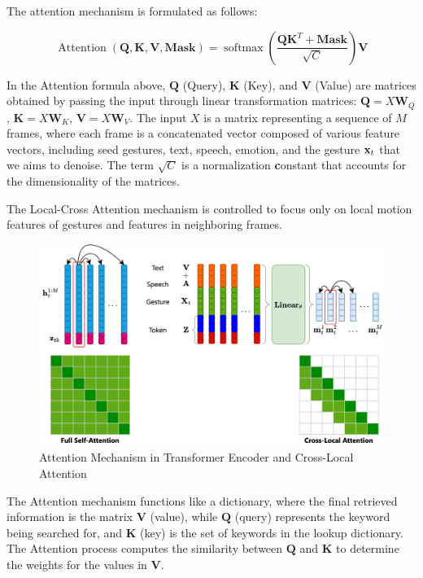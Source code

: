 The attention mechanism is formulated as follows:

\begin{equation} \label{eq:attention}
	\operatorname{Attention}(\mathbf{Q}, \mathbf{K}, \mathbf{V}, \mathbf{Mask})=\operatorname{softmax}\left(\frac{\mathbf{Q} \mathbf{K}^{T}+\mathbf{Mask}}{\sqrt{C}}\right) \mathbf{V}
\end{equation}

In the Attention formula above, $\mathbf{Q}$ (Query), $\mathbf{K}$ (Key), and $\mathbf{V}$ (Value) are matrices obtained by passing the input through linear transformation matrices: $\mathbf{Q} = {X} \mathbf{W}_Q$, $\mathbf{K} = {X} \mathbf{W}_K$, $\mathbf{V} = {X} \mathbf{W}_V$. The input $X$ is a matrix representing a sequence of $M$ frames, where each frame is a concatenated vector composed of various feature vectors, including seed gestures, text, speech, emotion, and the gesture $\mathbf{x}_t$ that we aims to denoise. The term $\sqrt{C}$ is a normalization \textbf{c}onstant that accounts for the dimensionality of the matrices. 

The Local-Cross Attention mechanism is controlled to focus only on local motion features of gestures and features in neighboring frames.

\begin{figure}[h]
	\centering
	\includegraphics[width=1\linewidth]{figures/CrossLocalAttention}
	\caption{Attention Mechanism in Transformer Encoder and Cross-Local Attention}
	\label{fig:CrossLocalAttention}
\end{figure}

The Attention mechanism functions like a dictionary, where the final retrieved information is the matrix $\mathbf{V}$ (value), while $\mathbf{Q}$ (query) represents the keyword being searched for, and $\mathbf{K}$ (key) is the set of keywords in the lookup dictionary. The Attention process computes the similarity between \( \mathbf{Q} \) and \( \mathbf{K} \) to determine the weights for the values in \( \mathbf{V} \).


